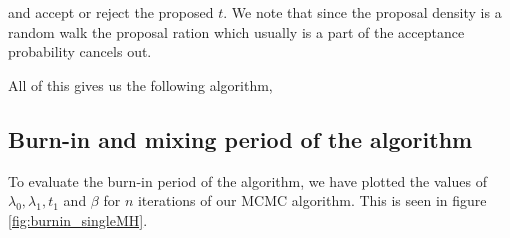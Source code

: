 and accept or reject the proposed $t$. We note that since the proposal density is a random walk the proposal ration which usually is a part of the acceptance probability cancels out. 

All of this gives us the following algorithm, 






\subsection{Burn-in and mixing period of the algorithm}

To evaluate the burn-in period of the algorithm, we have plotted the values of $\lambda_0, \lambda_1, t_1$ and $\beta$ for $n$ iterations of our MCMC algorithm. This is seen in figure \ref{fig:burnin_singleMH}. 


